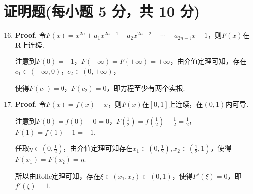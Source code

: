 \documentclass[../main.tex]{subfiles}
\begin{document}
\section{证明题(每小题 5 分，共 10 分)}
\begin{enumerate}
    \setcounter{enumi}{15}
    \item \textbf{Proof}. 令$F(x)=x^{2n}+a_{1}x^{2n-1}+a_{2}x^{2n-2}+\cdots+
              a_{2n-1}x-1$，则$F(x)$在$\mathbf{R}$上连续.

          注意到$F(0)=-1$，$F(-\infty)=F(+\infty)=+\infty$，由介值定理可知，存在$c_{1}\in
              (-\infty,0)$，$c_{2}\in(0,+\infty)$，

          使得$F(c_{1})=0$，$F(c_{2})=0$，即方程至少有两个实根.

    \item \textbf{Proof}. 令$F(x)=f(x)-x$，则$F(x)$在$[0,1]$上连续，在$(0,1)$内可导.

          注意到$F(0)=f(0)-0=0$，$F\left(\frac{1}{2}\right)=f\left(\frac{1}{2}\right)
              -\frac{1}{2}=\frac{1}{2}$，$F(1)=f(1)-1=-1$.

          任取$\eta\in\left(0,\frac{1}{2}\right)$，由介值定理可知存在$x_{1}\in\left(0
              ,\frac{1}{2}\right),x_{2}\in\left(\frac{1}{2},1\right)$，使得$F(x_{1})=F(x_{2}
              )=\eta$.

          所以由Rolle定理可知，存在$\xi\in(x_{1},x_{2})\subset(0,1)$，使得$F'(\xi)=0$，即$f
              '(\xi)=1$.
\end{enumerate}
\end{document}
